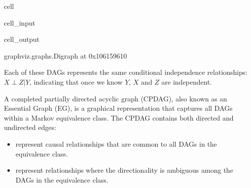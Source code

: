\documentclass[letterpaper,10pt,english]{jupyterBook}
\begin{document}
\begin{sphinxuseclass}{cell}\begin{sphinxVerbatimInput}

\begin{sphinxuseclass}{cell_input}
\begin{sphinxVerbatim}[commandchars=\\\{\}]
  
 
 
\end{sphinxVerbatim}

\end{sphinxuseclass}\end{sphinxVerbatimInput}
\begin{sphinxVerbatimOutput}

\begin{sphinxuseclass}{cell_output}
\begin{sphinxVerbatim}[commandchars=\\\{\}]
\PYGZlt{}graphviz.graphs.Digraph at 0x106159610\PYGZgt{}
\end{sphinxVerbatim}

\end{sphinxuseclass}\end{sphinxVerbatimOutput}

\end{sphinxuseclass}
\sphinxAtStartPar
Each of these DAGs represents the same conditional independence relationships: \(X \perp Z | Y\), indicating that once we know \(Y\), \(X\) and \(Z\) are independent.

\sphinxAtStartPar
A completed partially directed acyclic graph (CPDAG), also known as an Essential Graph (EG), is a graphical representation that captures all DAGs within a Markov equivalence class. The CPDAG contains both directed and undirected edges:
\begin{itemize}
\item {} 
\sphinxAtStartPar
{} represent causal relationships that are common to all DAGs in the equivalence class.

\item {} 
\sphinxAtStartPar
{} represent relationships where the directionality is ambiguous among the DAGs in the equivalence class.

\end{itemize}
\end{document}
